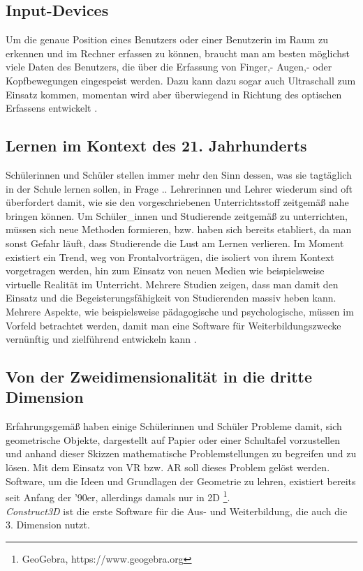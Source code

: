 \documentclass[deutsch]{llncs}
\begin{document}
\subsection{Input-Devices}
Um die genaue Position eines Benutzers oder einer Benutzerin im Raum zu erkennen und im Rechner erfassen zu können, braucht man am besten möglichst viele Daten des Benutzers, die über die Erfassung von Finger,- Augen,- oder Kopfbewegungen eingespeist werden. Dazu kann dazu sogar auch Ultraschall zum Einsatz kommen, momentan wird aber überwiegend in Richtung des optischen Erfassens entwickelt \cite{Klampfer}. 
\subsection{Lernen im Kontext des 21. Jahrhunderts}
Schülerinnen und Schüler stellen immer mehr den Sinn dessen, was sie tagtäglich in der Schule lernen sollen, in Frage \cite{Klampfer}.. Lehrerinnen und Lehrer wiederum sind oft überfordert damit, wie sie den vorgeschriebenen Unterrichtsstoff zeitgemäß nahe bringen können. Um Schüler\_innen und Studierende zeitgemäß zu unterrichten, müssen sich neue Methoden formieren, bzw. haben sich bereits etabliert, da man sonst Gefahr läuft, dass Studierende die Lust am Lernen verlieren. Im Moment existiert ein Trend, weg von Frontalvorträgen, die isoliert von ihrem Kontext vorgetragen werden, hin zum Einsatz von neuen Medien wie beispielsweise virtuelle Realität im Unterricht. Mehrere Studien \cite{Hu-Au} zeigen, dass man damit den Einsatz und die Begeisterungsfähigkeit von Studierenden massiv heben kann.
Mehrere Aspekte, wie beispielsweise pädagogische und psychologische, müssen im Vorfeld betrachtet werden, damit man eine Software für Weiterbildungszwecke vernünftig und zielführend entwickeln kann \cite{article}.
\subsection{Von der Zweidimensionalität in die dritte Dimension}
Erfahrungsgemäß haben einige Schülerinnen und Schüler Probleme damit, sich geometrische Objekte, dargestellt auf Papier oder einer Schultafel vorzustellen und anhand dieser Skizzen mathematische Problemstellungen zu begreifen und zu lösen. Mit dem Einsatz von VR bzw. AR soll dieses Problem gelöst werden.\\
Software, um die Ideen und Grundlagen der Geometrie zu lehren, existiert bereits seit Anfang der '90er, allerdings damals nur in 2D \footnote{GeoGebra, https://www.geogebra.org}. \\
\emph{Construct3D} ist die erste Software für die Aus- und Weiterbildung, die auch die 3. Dimension nutzt. %
\end{document}

